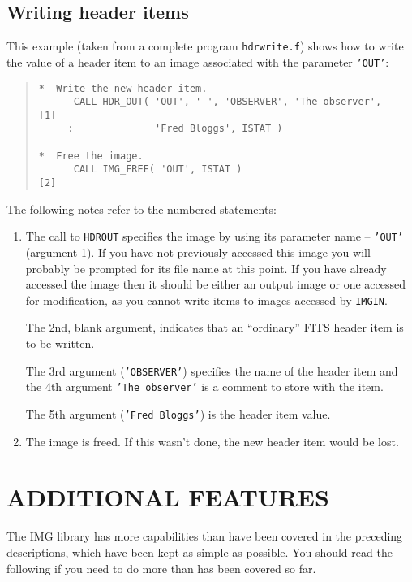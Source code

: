 \documentclass[twoside,11pt]{article}
\newcommand{\htmladdnormallink}[2]{#1}
\newcommand{\htmlref}[2]{#1}
\renewcommand{\_}{\texttt{\symbol{95}}}
\newcommand{\myverb}[1]{{\texttt{#1}}}
\newcommand{\mynote}{The following notes refer to the numbered statements:}
\newenvironment{code}{\begin{small} \begin{quote}}
                     {\end{quote} \end{small}}
\newenvironment{enumnotes}
{
   \renewcommand{\labelenumi}{\myverb{[\theenumi]}}
   \begin{enumerate}
}{
   \end{enumerate}
   \renewcommand{\labelenumi}{\theenumi}
}
\renewenvironment{enumnotes}
  {
    \begin{enumerate}
  }{
    \end{enumerate}
  }
\begin{document}
\subsection{Writing header items}
This example (taken from a complete program
\htmladdnormallink{\myverb{hdrwrite.f}}{../../bin/examples/img/hdrwrite.f}) shows how to write the value of a
header item to an image associated with the parameter \myverb{'OUT'}:
\begin{code}
\begin{verbatim}
*  Write the new header item.
      CALL HDR_OUT( 'OUT', ' ', 'OBSERVER', 'The observer',   [1]
     :              'Fred Bloggs', ISTAT )

*  Free the image.
      CALL IMG_FREE( 'OUT', ISTAT )                           [2]
\end{verbatim}
\end{code}
\mynote
\begin{enumnotes}
\item The call to \htmlref{\myverb{HDR\_OUT}}{HDR_OUTx} specifies the image by using its
parameter name -- \myverb{'OUT'} (argument 1). If you have not
previously accessed this image you will probably be prompted for its
file name at this point. If you have already accessed the image then
it should be either an output image or one accessed for modification,
as you cannot write items to images accessed by \htmlref{\myverb{IMG\_IN}}{IMG_INnx}.

The 2nd, blank argument, indicates that an ``ordinary'' FITS header
item is to be written.

The 3rd argument (\myverb{'OBSERVER'}) specifies the name of the header
item and the 4th argument \myverb{'The observer'} is a comment
to store with the item.

The 5th argument (\myverb{'Fred Bloggs'}) is the header item value.

\item The image is freed. If this wasn't done, the new header item
would be lost.
\end{enumnotes}

\section{ADDITIONAL FEATURES}
The IMG library has more capabilities than have been covered in the
preceding descriptions, which have been kept as simple as possible.
You should read the following  if you need to do more than has been
covered so far.
\end{document}

